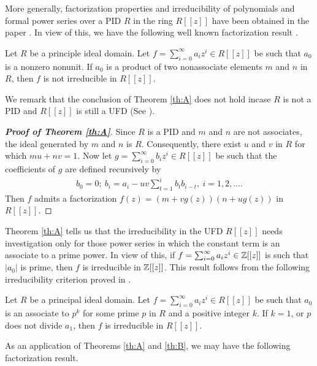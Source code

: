 \documentclass[12pt,reqno]{amsart}%
\begin{document}
More generally, factorization properties and irreducibility of polynomials and formal power series over a PID $R$  in the ring $R[[z]]$ have been obtained in the paper  \cite{Elliot}. In view of this, we have the following well known factorization result  \cite{Daniel2008,Elliot}.
\begin{thmx}\label{th:A}
Let $R$ be a principle ideal domain. Let $f=\sum_{i=0}^\infty a_iz^i\in R[[z]]$ be such that $a_0$ is a nonzero nonunit. If $a_0$ is a product of two nonassociate elements  $m$ and $n$ in $R$, then $f$ is not irreducible in $R[[z]]$.
\end{thmx}
We remark that the conclusion of Theorem \ref{th:A} does not hold incase $R$ is not a PID and $R[[z]]$ is still a UFD (See \cite[Corollary 2.3(3)]{Elliot}).
\begin{proof}[\bf Proof of Theorem \ref{th:A}] Since $R$ is a PID and $m$ and $n$ are not associates, the ideal generated by $m$ and $n$ is $R$. Consequently, there exist $u$ and $v$ in $R$ for which  $mu+nv=1$. Now let $g=\sum_{i=0}^\infty b_i z^i \in R[[z]]$ be such that the coefficients of $g$ are defined recursively by
\begin{eqnarray*}
b_0=0;~b_i=a_i-uv\sum_{t=1}^{i}b_tb_{i-t},~i=1,2,\ldots.
\end{eqnarray*}
Then $f$ admits a factorization $f(z)=(m+vg(z))(n+ug(z))$ in $R[[z]]$.
\end{proof}
Theorem \ref{th:A} tells us that the irreducibility in the UFD $R[[z]]$ needs investigation only for those power series in which the constant term is an associate to a  prime power. In view of this, if $f=\sum_{i=0}^\infty a_i z^i \in \Bbb{Z}[[z]]$ is such that $|a_0|$ is prime,  then $f$ is irreducible in $\Bbb{Z}[[z]]$. %
This result follows from the following irreducibility criterion proved in \cite{Elliot}.
\begin{thmx}\label{th:B}
   Let $R$ be a principal ideal domain. Let $f=\sum_{i=0}^\infty a_i z^i \in R[[z]]$ be such that  $a_0$ is an associate to $p^k$ for some prime $p$ in $R$ and a positive integer $k$. If  $k=1$, or $p$ does not divide $a_1$, then $f$ is irreducible in $R[[z]]$.
\end{thmx}
As an application of Theorems \ref{th:A} and \ref{th:B}, we may have the following factorization result.
\end{document}

